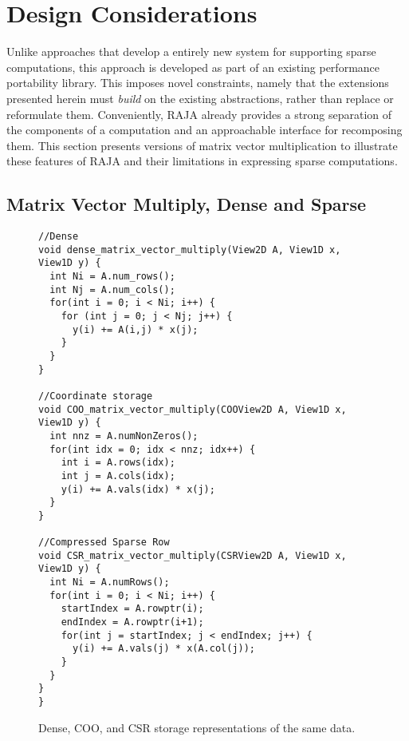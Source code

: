 \section{Design Considerations}
Unlike approaches that develop a entirely new system for supporting sparse computations, this approach is developed as part of an existing performance portability library.
This imposes novel constraints, namely that the extensions presented herein must \textit{build} on the existing abstractions, rather than replace or reformulate them.
Conveniently, RAJA already provides a strong separation of the components of a computation and an approachable interface for recomposing them.
This section presents versions of matrix vector multiplication to illustrate these features of RAJA and their limitations in expressing sparse computations.


\subsection{Matrix Vector Multiply, Dense and Sparse}
\begin{figure}
\begin{lstlisting}[caption={Matrix vector multiply routines for matrices in different formats.},label=DenseAndSparseMV]  
//Dense
void dense_matrix_vector_multiply(View2D A, View1D x, View1D y) {
  int Ni = A.num_rows();
  int Nj = A.num_cols();
  for(int i = 0; i < Ni; i++) {
    for (int j = 0; j < Nj; j++) {
      y(i) += A(i,j) * x(j);
    }
  }
}

//Coordinate storage
void COO_matrix_vector_multiply(COOView2D A, View1D x, View1D y) {
  int nnz = A.numNonZeros();
  for(int idx = 0; idx < nnz; idx++) {
    int i = A.rows(idx);
    int j = A.cols(idx);
    y(i) += A.vals(idx) * x(j);
  }
}

//Compressed Sparse Row
void CSR_matrix_vector_multiply(CSRView2D A, View1D x, View1D y) {
  int Ni = A.numRows();
  for(int i = 0; i < Ni; i++) {
    startIndex = A.rowptr(i);
    endIndex = A.rowptr(i+1);
    for(int j = startIndex; j < endIndex; j++) {
      y(i) += A.vals(j) * x(A.col(j));
    }
  }
}
}
\end{lstlisting}
\end{figure}
\begin{figure}
\caption{Dense, COO, and CSR storage representations of the same data.}
\label{FormatDiagram}
\end{figure}

